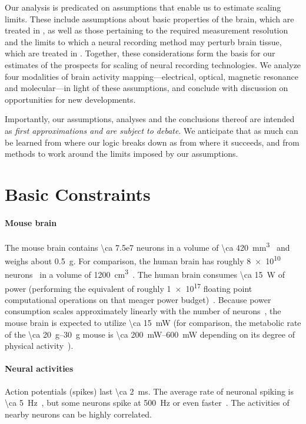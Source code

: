 Our analysis is predicated on assumptions that enable us to estimate scaling limits.
These include assumptions about basic properties of the brain, which are treated in , as well as those pertaining to the required measurement resolution and the limits to which a neural recording method may perturb brain tissue, which are treated in .
Together, these considerations form the basis for our estimates of the prospects for scaling of neural recording technologies.
We analyze four modalities of brain activity mapping---electrical, optical, magnetic resonance and molecular---in light of these assumptions, and conclude with discussion on opportunities for new developments.

Importantly, our assumptions, analyses and the conclusions thereof are intended as \emph{first approximations and are subject to debate}.
We anticipate that as much can be learned from where our logic breaks down as from where it succeeds, and from methods to work around the limits imposed by our assumptions.

\section{Basic Constraints}
\label{sec:constraints}

\paragraph{Mouse brain}
The mouse brain contains \num{\ca 7.5e7} neurons in a volume of \SI{\ca 420}{\milli\meter\cubed}~\cite{vincent10} and weighs about \SI{0.5}{\gram}.
For comparison, the human brain has roughly \num{8e10} neurons~\cite{azevedo09} in a volume of \SI{1200}{\centi\meter\cubed}~\cite{allen02}.
The human brain consumes \SI{\ca 15}{\watt} of power (performing the equivalent of roughly \num{1e17} floating point computational operations on that meager power budget)~\cite{sarpeshkar10}.
Because power consumption scales approximately linearly with the number of neurons~\cite{houzel11}, the mouse brain is expected to utilize \SI{\ca 15}{\milli\watt} (for comparison, the metabolic rate of the \SIrange{\ca 20}{30}{\gram} mouse is \SIrange{\ca 200}{600}{\milli\watt} depending on its degree of physical activity~\cite{speakman13}).

\paragraph{Neural activities}
Action potentials (spikes) last \SI{\ca 2}{\milli\second}.
The average rate of neuronal spiking is \SI{\ca 5}{\hertz}~\cite{sarpeshkar10}, but some neurons spike at \SI{500}{\hertz} or even faster~\cite{gittis10}.
The activities of nearby neurons can be highly correlated.


